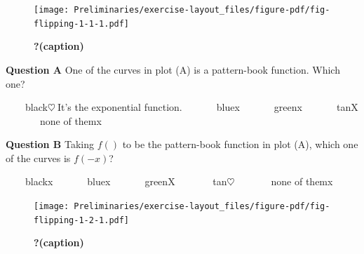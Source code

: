\documentclass[
  letterpaper,
  DIV=11,
  numbers=noendperiod,
  oneside]{article}
\begin{document}
\begin{multicols}{2}
\begin{table}
\begin{minipage}[t]{\linewidth}
{\begin{figure}

{\centering \texttt{[image: Preliminaries/exercise-layout\_files/figure-pdf/fig-flipping-1-1-1.pdf]}

}

\caption{\label{fig-flipping-1-1}\textbf{?(caption)}}

\end{figure}

}

\end{minipage}%
\newline
\begin{minipage}[t]{\linewidth}

{\centering 

\textbf{Question A} One of the curves in plot (A) is a pattern-book
function. Which one?

~~~~{black{\(\heartsuit\ \)It's the exponential
function.}}~~~~~~~{blue{x}}~~~~~~~{green{x}}~~~~~~~{tan{︎X
}}~~~~~~~{none of them{x}}

}

\end{minipage}%
\newline
\begin{minipage}[t]{\linewidth}

{\centering 

\textbf{Question B} Taking \(f()\) to be the pattern-book function in
plot (A), which one of the curves is \(f(-x)\)?

~~~~{black{x}}~~~~~~~{blue{x}}~~~~~~~{green{︎X
}}~~~~~~~{tan{\(\heartsuit\ \)}}~~~~~~~{none of them{x}}

}

\end{minipage}%
\newline
\begin{minipage}[t]{\linewidth}

{\centering 

\begin{figure}

{\centering \texttt{[image: Preliminaries/exercise-layout\_files/figure-pdf/fig-flipping-1-2-1.pdf]}

}

\caption{\label{fig-flipping-1-2}\textbf{?(caption)}}

\end{figure}

}

\end{minipage}%
\newline
\begin{minipage}[t]{\linewidth}


\end{minipage}
\end{table}
\end{multicols}
\end{document}
